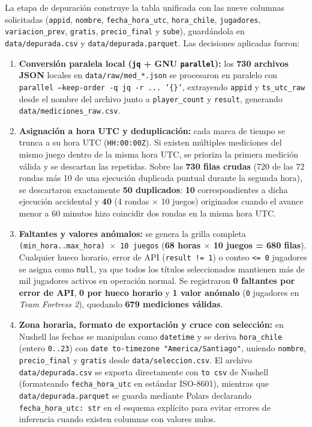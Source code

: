 \documentclass[11pt,a4paper]{article}
\begin{document}
La etapa de depuración construye la tabla unificada con las nueve columnas solicitadas (\texttt{appid}, \texttt{nombre}, \texttt{fecha\_hora\_utc}, \texttt{hora\_chile}, \texttt{jugadores}, \texttt{variacion\_prev}, \texttt{gratis}, \texttt{precio\_final} y \texttt{sube}), guardándola en \texttt{data/depurada.csv} y \texttt{data/depurada.parquet}. Las decisiones aplicadas fueron:

\begin{enumerate}
    \item \textbf{Conversión paralela local (\texttt{jq} + GNU \texttt{parallel}):} los \textbf{730 archivos JSON} locales en \texttt{data/raw/med\_*.json} se procesaron en paralelo con \texttt{parallel --keep-order -q jq -r ... '\{\}'}, extrayendo \texttt{appid} y \texttt{ts\_utc\_raw} desde el nombre del archivo junto a \texttt{player\_count} y \texttt{result}, generando \texttt{data/mediciones\_raw.csv}.
    \item \textbf{Asignación a hora UTC y deduplicación:} cada marca de tiempo se trunca a su hora UTC (\texttt{HH:00:00Z}). Si existen múltiples mediciones del mismo juego dentro de la misma hora UTC, se prioriza la primera medición válida y se descartan las repetidas. Sobre las \textbf{730 filas crudas} (720 de las 72 rondas más 10 de una ejecución duplicada puntual durante la segunda hora), se descartaron exactamente \textbf{50 duplicados}: \textbf{10} correspondientes a dicha ejecución accidental y \textbf{40} (4 rondas $\times$ 10 juegos) originados cuando el avance menor a 60 minutos hizo coincidir dos rondas en la misma hora UTC.
    \item \textbf{Faltantes y valores anómalos:} se genera la grilla completa \texttt{(min\_hora..max\_hora) $\times$ 10 juegos} (\textbf{68 horas $\times$ 10 juegos = 680 filas}). Cualquier hueco horario, error de API (\texttt{result != 1}) o conteo \texttt{<= 0} jugadores se asigna como \texttt{null}, ya que todos los títulos seleccionados mantienen más de mil jugadores activos en operación normal. Se registraron \textbf{0 faltantes por error de API}, \textbf{0 por hueco horario} y \textbf{1 valor anómalo} (\texttt{0} jugadores en \emph{Team Fortress 2}), quedando \textbf{679 mediciones válidas}.
    \item \textbf{Zona horaria, formato de exportación y cruce con selección:} en Nushell las fechas se manipulan como \texttt{datetime} y se deriva \texttt{hora\_chile} (entero \texttt{0..23}) con \texttt{date to-timezone "America/Santiago"}, uniendo \texttt{nombre}, \texttt{precio\_final} y \texttt{gratis} desde \texttt{data/seleccion.csv}. El archivo \texttt{data/depurada.csv} se exporta directamente con \texttt{to csv} de Nushell (formateando \texttt{fecha\_hora\_utc} en estándar ISO-8601), mientras que \texttt{data/depurada.parquet} se guarda mediante Polars declarando \texttt{fecha\_hora\_utc: str} en el esquema explícito para evitar errores de inferencia cuando existen columnas con valores nulos.

\end{enumerate}
\end{document}
